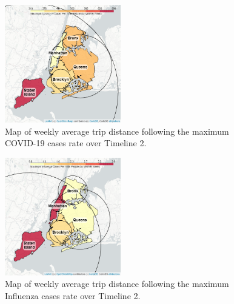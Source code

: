 \documentclass[11pt]{article}
\begin{document}
\begin{multicols}{2}
    \begin{figure}[H]

        \centering
    
        \includegraphics[width=0.45\textwidth]{../plots/map-avg-trip-distance-at-max-covid-by-pu_borough-MODIFIED.png}
    
        \caption{Map of weekly average trip distance following the maximum COVID-19 cases rate over Timeline 2.} %
        \label{map:covid}
    \end{figure}
    
    \begin{figure}[H]
    
        \centering
    
        \includegraphics[width=0.45\textwidth]{../plots/map-avg-trip-distance-at-max-flu-by-pu_borough-MODIFIED.png}
    
        \caption{Map of weekly average trip distance following the maximum Influenza cases rate over Timeline 2.} %
        \label{map:flu}
    \end{figure}    
\end{multicols}
\end{document}
